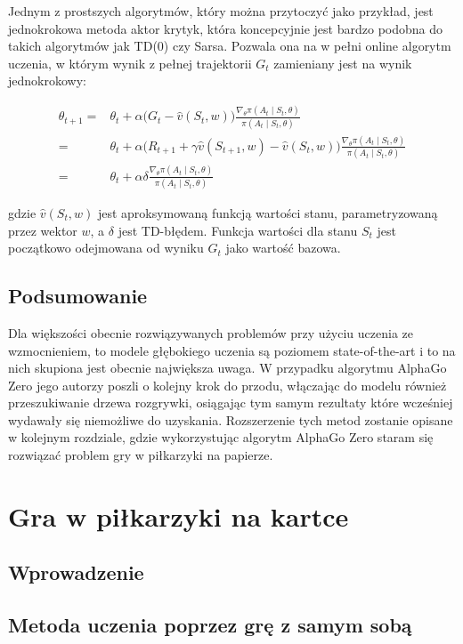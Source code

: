 \documentclass[licencjacka]{pracamgr}
\begin{document}
Jednym z prostszych algorytmów, który można przytoczyć jako przykład, jest jednokrokowa metoda aktor krytyk, która koncepcyjnie jest bardzo podobna do takich algorytmów jak TD(0) czy Sarsa. Pozwala ona na w pełni online algorytm uczenia, w którym wynik z pełnej trajektorii $G_t$ zamieniany jest na wynik jednokrokowy:

\begin{align*}
\theta_{t+1} =& \theta_t + \alpha \Big( G_t - \hat{v}(S_t, w) \Big) \frac{\nabla_\theta \pi(A_t \mid S_t, \theta)}{\pi(A_t \mid S_t, \theta)} \\
=& \theta_t + \alpha \Big( R_{t+1} + \gamma \hat{v}(S_{t+1}, w) - \hat{v}(S_t, w) \Big) \frac{\nabla_\theta \pi(A_t \mid S_t, \theta)}{\pi(A_t \mid S_t, \theta)} \\
=& \theta_t + \alpha \delta \frac{\nabla_\theta \pi(A_t \mid S_t, \theta)}{\pi(A_t \mid S_t, \theta)}
\end{align*}

gdzie $ \hat{v}(S_t, w) $ jest aproksymowaną funkcją wartości stanu, parametryzowaną przez wektor $w$, a $\delta$ jest TD-błędem. Funkcja wartości dla stanu $S_t$ jest początkowo odejmowana od wyniku $G_t$ jako wartość bazowa. 

\section{Podsumowanie}

Dla większości obecnie rozwiązywanych problemów przy użyciu uczenia ze wzmocnieniem, to modele głębokiego uczenia są poziomem state-of-the-art i to na nich skupiona jest obecnie największa uwaga. W przypadku algorytmu AlphaGo Zero jego autorzy poszli o kolejny krok do przodu, włączając do modelu również przeszukiwanie drzewa rozgrywki, osiągając tym samym rezultaty które wcześniej wydawały się niemożliwe do uzyskania. Rozszerzenie tych metod zostanie opisane w kolejnym rozdziale, gdzie wykorzystując algorytm AlphaGo Zero staram się rozwiązać problem gry w piłkarzyki na papierze.

\chapter{Gra w piłkarzyki na kartce}

\section{Wprowadzenie}

\section{Metoda uczenia poprzez grę z samym sobą}
\end{document}
